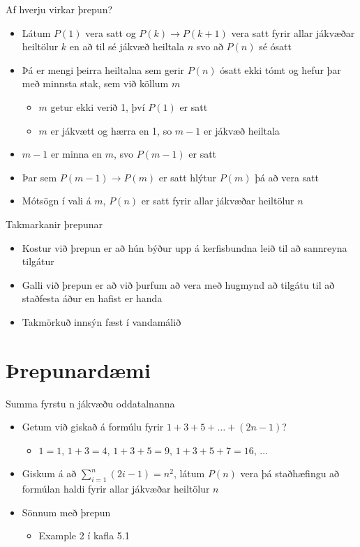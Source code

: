 \documentclass[handout]{beamer}
\begin{document}
\begin{frame}{Af hverju virkar þrepun?}
    \begin{itemize}
        \item Látum $P(1)$ vera satt og $P(k) \to P(k+1)$ vera satt fyrir allar jákvæðar heiltölur $k$ en að til sé jákvæð heiltala $n$ svo að $P(n)$ sé ósatt
        \item Þá er mengi þeirra heiltalna sem gerir $P(n)$ ósatt ekki tómt og hefur þar með minnsta stak, sem við köllum $m$ \pause
        \begin{itemize}
            \item $m$ getur ekki verið 1, því $P(1)$ er satt \pause
            \item $m$ er jákvætt og hærra en 1, so $m-1$ er jákvæð heiltala \pause
        \end{itemize}
        \item $m-1$ er minna en $m$, svo $P(m-1)$ er satt \pause
        \item Þar sem $P(m-1) \to P(m)$ er satt hlýtur $P(m)$ þá að vera satt \pause
        \item Mótsögn í vali á $m$, $P(n)$ er satt fyrir allar jákvæðar heiltölur $n$ 
    \end{itemize}
\end{frame}

\begin{frame}{Takmarkanir þrepunar}
    \begin{itemize}
        \item Kostur við þrepun er að hún býður upp á kerfisbundna leið til að sannreyna tilgátur
        \item Galli við þrepun er að við þurfum að vera með hugmynd að tilgátu til að staðfesta áður en hafist er handa
        \item Takmörkuð innsýn fæst í vandamálið
    \end{itemize}
\end{frame}

\section{Þrepunardæmi}

\begin{frame}{Summa fyrstu n jákvæðu oddatalnanna}
    \begin{itemize}
        \item Getum við giskað á formúlu fyrir $1+3+5+\ldots +(2n-1)$?
        \begin{itemize}
            \item $1=1$, $1+3=4$, $1+3+5=9$, $1+3+5+7=16$, $\ldots$\pause
        \end{itemize}
        \item Giskum á að $\sum_{i=1}^n(2i-1)=n^2$, látum $P(n)$ vera þá staðhæfingu að formúlan haldi fyrir allar jákvæðar heiltölur $n$
        \item Sönnum með þrepun
        \begin{itemize}
            \item Example 2 í kafla 5.1
        \end{itemize}
    \end{itemize}
\end{frame}
\end{document}
